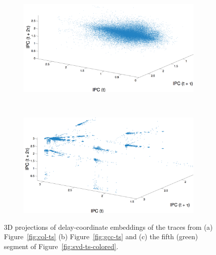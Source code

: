 \begin{figure}
    \begin{subfigure}{\columnwidth}
    \includegraphics[width=\columnwidth]{figs/gcc3dipc.png}
    \caption{\gcc}
    \label{fig:gccEmbedding}
  \end{subfigure} 
  \\
  \begin{subfigure}{\columnwidth}
    \includegraphics[width=\columnwidth]{figs/svd53dipc2.png}
    \caption{\svdfive}
    \label{fig:svdfiveEmbedding}
  \end{subfigure}%
%  
 
   
     \caption{3D projections of delay-coordinate embeddings of the
       traces from (a) Figure~\ref{fig:col-ts} (b)
       Figure~\ref{fig:gcc-ts} and (c) the fifth (green) segment of
       Figure~\ref{fig:svd-ts-colored}.}
 \label{fig:embedding}
 \end{figure}
%

